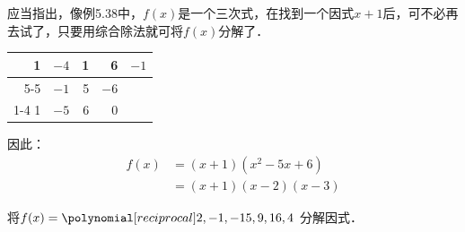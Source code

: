 应当指出，像例5.38中，$f(x)$是一个三次式，在找到一个因式$x+1$后，可不必再去试了，只要用综合除法就可将$f(x)$分解了．
\begin{center}
\begin{tabular}{rrrr|r}
    1 &$-4$&1&6  &$-1$\\
    \cline{5-5}
    & $-1$ & 5& $-6$\\
    \cline{1-4}
    1&$-5$ & 6&0\\
\end{tabular}    
\end{center}
因此：
\[\begin{split}
    f(x)&=(x+1)(x^2-5x+6)\\
    &=(x+1)(x-2)(x-3)
\end{split}\]

\begin{example}
    将$f(x)=\poly{2,-1,-15,9,16,4}$ 分解因式．
\end{example}


